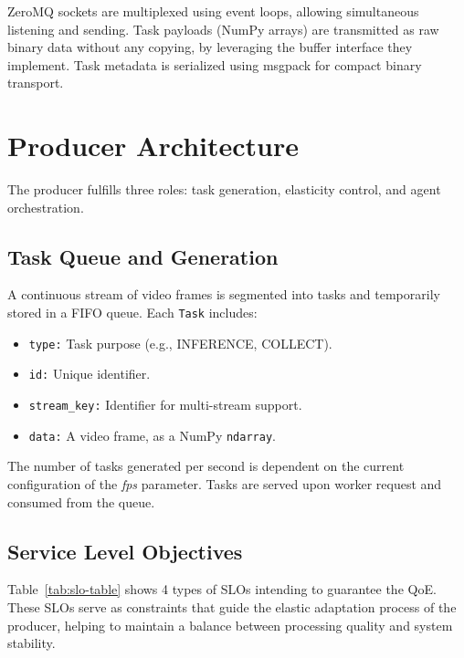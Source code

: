 ZeroMQ sockets are multiplexed using event loops, allowing simultaneous listening and sending. Task payloads (NumPy arrays) are transmitted as raw binary data without any copying, by leveraging the buffer interface they implement. Task metadata is serialized using msgpack \cite{noauthor_msgpackmsgpack-python_nodate} for compact binary transport.


\section{Producer Architecture}
The producer fulfills three roles: task generation, elasticity control, and agent orchestration.

\subsection{Task Queue and Generation}
A continuous stream of video frames is segmented into tasks and temporarily stored in a FIFO queue. Each \texttt{Task} includes:
\begin{itemize}
    \item \texttt{type:} Task purpose (e.g., INFERENCE, COLLECT).
    \item \texttt{id:} Unique identifier.
    \item \texttt{stream\_key:} Identifier for multi-stream support.
    \item \texttt{data:} A video frame, as a NumPy \texttt{ndarray}.
\end{itemize}
The number of tasks generated per second is dependent on the current configuration of the \textit{fps} parameter. Tasks are served upon worker request and consumed from the queue.

\subsection{Service Level Objectives}

Table~\ref{tab:slo-table} shows 4 types of SLOs intending to guarantee the QoE. These SLOs serve as constraints that guide the elastic adaptation process of the producer, helping to maintain a balance between processing quality and system stability.

